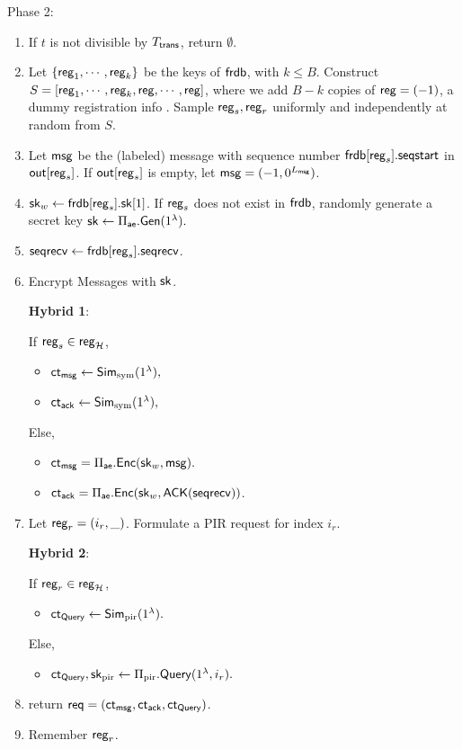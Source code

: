 Phase 2:
\begin{enumerate}
    \item If $t$ is not divisible by $T_{\mathsf{trans}}$, return $\emptyset$.
    \item Let $\{\mathsf{reg}_1, \cdots, \mathsf{reg}_k\}$ be the keys of $\mathsf{frdb}$, with $k\leq B$. Construct $S = [\mathsf{reg}_1,\cdots, \mathsf{reg}_k, \mathsf{reg}, \cdots, \mathsf{reg}]$, where we add $B - k$ copies of $\mathsf{reg} = (-1)$, a dummy registration info . Sample $\mathsf{reg}_s, \mathsf{reg}_r$ uniformly and independently at random from $S$. 
    \item Let $\mathsf{msg}$ be the (labeled) message with sequence number $\mathsf{frdb}[\mathsf{reg}_s].\mathsf{seqstart}$ in $\mathsf{out}[\mathsf{reg}_s]$. If $\mathsf{out}[\mathsf{reg}_s]$ is empty, let $\mathsf{msg} = (-1, 0^{L_{\mathsf{msg}}})$.
    \item ${\mathsf{sk}}_w \leftarrow \mathsf{frdb}[\mathsf{reg}_s].{\mathsf{sk}}[1]$. If $\mathsf{reg}_s$ does not exist in $\mathsf{frdb}$, randomly generate a secret key ${\mathsf{sk}} \leftarrow \Pi_{\mathsf{ae}}.\mathsf{Gen}(1^{\lambda}).$
    \item $\mathsf{seqrecv} \leftarrow \mathsf{frdb}[\mathsf{reg}_s].\mathsf{seqrecv}$.
    \item Encrypt Messages with ${\mathsf{sk}}$.
    
    {\color{red} 
    \textbf{Hybrid 1}:
    
    If $\mathsf{reg}_s \in \mathsf{reg}_{\mathcal{H}}$, 
    \begin{itemize}
        \item $\mathsf{ct}_{\mathsf{msg}} \leftarrow \mathsf{Sim}_{\text{sym}}(1^{\lambda}),$
        \item $\mathsf{ct}_{\mathsf{ack}} \leftarrow \mathsf{Sim}_{\text{sym}}(1^{\lambda}),$
    \end{itemize}
    Else, 
    }
    
    
    \begin{itemize}
        \item $\mathsf{ct}_{\mathsf{msg}} = \Pi_{\mathsf{ae}}.\mathsf{Enc}({\mathsf{sk}}_w, \mathsf{msg}).$
        \item $\mathsf{ct}_{\mathsf{ack}} = \Pi_{\mathsf{ae}}.\mathsf{Enc}({\mathsf{sk}}_w, \mathsf{ACK}(\mathsf{seqrecv}))$.
    \end{itemize}
    \item Let $\mathsf{reg}_r = (i_r, \_)$. Formulate a PIR request for index $i_r$. 
    
     {
     \color{red}
          
     \textbf{Hybrid 2}:
         
     If $\mathsf{reg}_r \in \mathsf{reg}_{\mathcal{H}}$, 
    \begin{itemize}
        \item $\mathsf{ct}_{\mathsf{Query}} \leftarrow \mathsf{Sim}_{\text{pir}}(1^{\lambda}).$
    \end{itemize}
    Else, 
    }
    \begin{itemize}
        \item $\mathsf{ct}_{\mathsf{Query}}, {\mathsf{sk}}_{\text{pir}} \leftarrow \Pi_{\text{pir}}.\mathsf{Query}(1^{\lambda}, i_r).$
    \end{itemize}
    \item return $\mathsf{req} = (\mathsf{ct}_{\mathsf{msg}}, \mathsf{ct}_{\mathsf{ack}}, \mathsf{ct}_{\mathsf{Query}})$.
    \item Remember $\mathsf{reg}_r$.
\end{enumerate}

